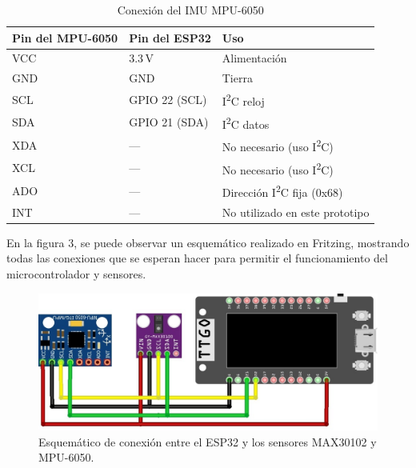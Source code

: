 \documentclass[12pt, a4paper]{article}
\begin{document}
	
	\begin{table}[ht]
		\centering
		\caption{Conexión del IMU MPU-6050}
		\label{tab:conexion_mpu6050}
		\begin{tabular}{|p{3.5cm}|p{3cm}|p{5cm}|}
			\hline
			\textbf{Pin del MPU-6050} & \textbf{Pin del ESP32}      & \textbf{Uso}                            \\ \hline
			VCC                        & 3.3\,V                       & Alimentación                                  \\ \hline
			GND                        & GND                          & Tierra                                           \\ \hline
			SCL                        & GPIO 22 (SCL)                & I\textsuperscript{2}C reloj                    \\ \hline
			SDA                        & GPIO 21 (SDA)                & I\textsuperscript{2}C datos                    \\ \hline
			XDA                        & —                            & No necesario (uso I\textsuperscript{2}C)        \\ \hline
			XCL                        & —                            & No necesario (uso I\textsuperscript{2}C)        \\ \hline
			ADO                        & —                            & Dirección I\textsuperscript{2}C fija (0x68)     \\ \hline
			INT                        & —                            & No utilizado en este prototipo                \\ \hline
		\end{tabular}
	\end{table}
	
	
	En la figura 3, se puede observar un esquemático realizado en Fritzing, mostrando todas las conexiones que se esperan hacer para permitir el funcionamiento del microcontrolador y sensores.
	\begin{figure}[htbp]
		\centering
		\includegraphics[width=\textwidth]{images/esquema_prototipo.jpg}
		\caption[Esquemático del prototipo]{Esquemático de conexión entre el ESP32 y los sensores MAX30102 y MPU-6050.}
		\label{fig:esquema_prototipo}
	\end{figure}
	
\end{document}
